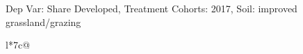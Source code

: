 \begin{table}[H]
\captionlistentry[table]{}
\label{table:beaver_land_class_DVis_land_class_3_SCg2_SSIGRG}
\scriptsize %
Dep Var: Share Developed, Treatment Cohorts: 2017, Soil: improved grassland/grazing \\
\begin{threeparttable}
\begin{tabulary}{\textwidth}{l*{7}{c}@{}}
\toprule \toprule
\noalign{\smallskip}
\noalign{\smallskip}
\midrule \bottomrule
\end{tabulary}
\medskip
\end{threeparttable}
\end{table}
